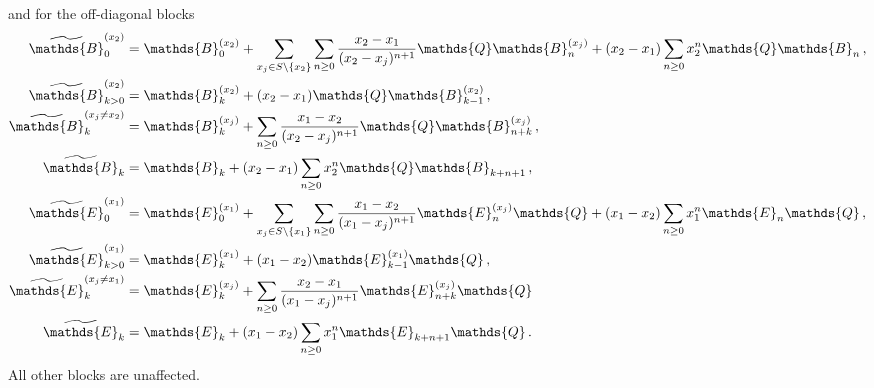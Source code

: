 \documentclass[12pt]{article}
\numberwithin{equation}{section}
\numberwithin{figure}{section}
\newcommand{\B}{\mathds{B}}
\newcommand{\E}{\mathds{E}}
\newcommand{\Q}{\mathds{Q}}
\begin{document}
      and for the off-diagonal blocks
      \begin{align*}
        \widetilde \B^{(x_2)}_0 &=
        \B^{(x_2)}_0
        +
        \sum\limits_{x_j\in S\backslash\{x_2\}}
        \sum\limits_{n\geq0} \frac{x_2-x_1}{(x_2-x_j)^{n+1}} 
        \Q \B^{(x_j)}_n
        + (x_2-x_1) \sum\limits_{n\geq0} x_2^n \Q \B_n\,,
        \\
        \widetilde \B^{(x_2)}_{k>0} &=
        \B^{(x_2)}_k
        +
        (x_2-x_1)
        \Q \B^{(x_2)}_{k-1}\,,
        \\
        \widetilde \B^{(x_j\neq x_2)}_k &=
        \B^{(x_j)}_k
        + 
        \sum\limits_{n\geq0} 
        \frac{x_1-x_2}{(x_2-x_j)^{n+1}} 
        \Q \B^{(x_j)}_{n+k}\,, 
        \\
        \widetilde \B_k &= 
        \B_k +
        (x_2-x_1)
        \sum\limits_{n\geq0}
        x_2^n \Q \B_{k+n+1} \,,
        \\
        \widetilde \E^{(x_1)}_0 &=
        \E^{(x_1)}_0
        +
        \sum\limits_{x_j\in S\backslash\{x_1\}} 
        \sum\limits_{n\geq0} 
        \frac{x_1-x_2}{(x_1-x_j)^{n+1}} 
        \E^{(x_j)}_n \Q
        + (x_1-x_2) \sum\limits_{n\geq0} x_1^n \E_n \Q\,,
        \\
        \widetilde \E^{(x_1)}_{k>0} &=
        \E^{(x_1)}_k
        +
        (x_1-x_2) \E^{(x_1)}_{k-1} \Q\,,
        \\
        \widetilde \E^{(x_j\neq x_1)}_k &=
        \E^{(x_j)}_k
        +
        \sum\limits_{n\geq0} 
        \frac{x_2-x_1}{(x_1-x_j)^{n+1}} 
        \E^{(x_j)}_{n+k} \Q 
        \\
        \widetilde \E_k &= 
        \E_k +
        (x_1 - x_2)
        \sum\limits_{n\geq0}
        x_1^n \E_{k+n+1} \Q\,.
      \end{align*}
      All other blocks are unaffected.
\end{document}
